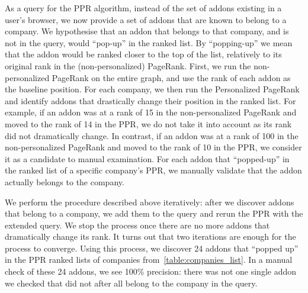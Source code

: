 \documentclass[ijoc,nonblindrev]{informs3} %
\numberwithin{equation}{subsection}
\begin{document}
As a query for the PPR algorithm, instead of the set of addons existing in a user's browser, we now provide a set of addons that are known to belong to a company. We hypothesise that an addon that belongs to that company, and is not in the query, would ``pop-up'' in the ranked list. By ``popping-up'' we mean that the addon would be ranked closer to the top of the list, relatively to its original rank in the (non-personalized) PageRank. First, we run the non-personalized PageRank on the entire graph, and use the rank of each addon as the baseline position. For each company, we then run the Personalized PageRank and identify addons that drastically change their position in the ranked list. For example, if an addon was at a rank of 15 in the non-personalized PageRank and moved to the rank of 14 in the PPR, we do not take it into account as its rank did not dramatically change. In contrast, if an addon was at a rank of 100 in the non-personalized PageRank and moved to the rank of 10 in the PPR, we consider it as a candidate to manual examination. For each addon that ``popped-up'' in the ranked list of a specific company's PPR, we manually validate that the addon actually belongs to the company.

We perform the procedure described above iteratively: after we discover addons that belong to a company, we add them to the query and rerun the PPR with the extended query. We stop the process once there are no more addons that dramatically change its rank. It turns out that two iterations are enough for the process to converge. Using this process, we discover 24 addons that ``popped up'' in the PPR ranked lists of companies from~\autoref{table:companies_list}. In a manual check of these 24 addons, we see 100\% precision: there was not one single addon we checked that did not after all belong to the company in the query. 

\end{document}
